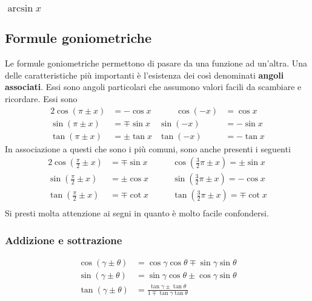 \subsubsection{$\arcsin x$}
\begin{center}
\end{center}

\subsection{Formule goniometriche}
Le formule goniometriche permettono di pasare da una funzione ad un'altra. Una delle caratteristiche 
più importanti è l'esistenza dei così denominati \textbf{angoli associati}. Essi sono angoli 
particolari che assumono valori facili da scambiare e ricordare. Essi sono
\begin{alignat*}{2}
  \cos(\pi\pm x) & = -\cos x &\qquad \cos(-x) &= \cos x\\
  \sin(\pi\pm x) &= \mp\sin x & \sin(-x) &= -\sin x\\
  \tan(\pi\pm x) &= \pm\tan x & \tan(-x) &= -\tan x
\end{alignat*}
In associazione a questi che sono i più comuni, sono anche presenti i seguenti
\begin{alignat*}{2}
  \cos\left(\frac{\pi}{2}\pm x\right) &= \mp\sin x &\qquad \cos\left(\frac{3}{2}\pi\pm x\right) = 
  \pm\sin x\\
  \sin\left(\frac{\pi}{2}\pm x\right) &= \pm\cos x &\qquad \sin\left(\frac{3}{2}\pi\pm x\right) = 
  -\cos x\\
  \tan\left(\frac{\pi}{2}\pm x\right) &= \mp\cot x &\qquad \tan\left(\frac{3}{2}\pi\pm x\right) = 
  \mp\cot x\\
\end{alignat*}
Si presti molta attenzione ai segni in quanto è molto facile confondersi.

\subsubsection{Addizione e sottrazione}
\begin{align*}
  \cos(\gamma\pm\theta) &= \cos\gamma\cos\theta\mp\sin\gamma\sin\theta\\
  \sin(\gamma\pm\theta) &= \sin\gamma\cos\theta\pm\cos\gamma\sin\theta\\
  \tan(\gamma\pm\theta) &= \frac{\tan\gamma\pm\tan\theta}{1\mp\tan\gamma\tan\theta}
\end{align*}

